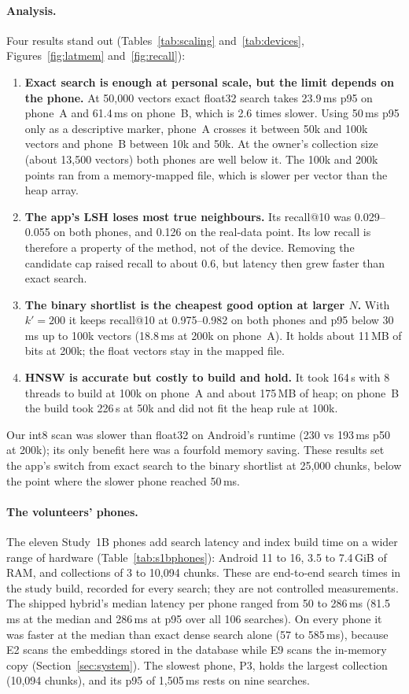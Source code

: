 \documentclass[11pt,a4paper]{article}
\begin{document}
\paragraph{Analysis.} Four results stand out (Tables~\ref{tab:scaling} and~\ref{tab:devices}, Figures~\ref{fig:latmem} and~\ref{fig:recall}):
\begin{enumerate}
  \item \textbf{Exact search is enough at personal scale, but the limit depends on the phone.} At 50,000 vectors exact float32 search takes 23.9\,ms p95 on phone~A and 61.4\,ms on phone~B, which is 2.6 times slower. Using 50\,ms p95 only as a descriptive marker, phone~A crosses it between 50k and 100k vectors and phone~B between 10k and 50k. At the owner's collection size (about 13,500 vectors) both phones are well below it. The 100k and 200k points ran from a memory-mapped file, which is slower per vector than the heap array.
  \item \textbf{The app's LSH loses most true neighbours.} Its recall@10 was 0.029--0.055 on both phones, and 0.126 on the real-data point. Its low recall is therefore a property of the method, not of the device. Removing the candidate cap raised recall to about 0.6, but latency then grew faster than exact search.
  \item \textbf{The binary shortlist is the cheapest good option at larger $N$.} With $k'=200$ it keeps recall@10 at 0.975--0.982 on both phones and p95 below 30\,ms up to 100k vectors (18.8\,ms at 200k on phone~A). It holds about 11\,MB of bits at 200k; the float vectors stay in the mapped file.
  \item \textbf{HNSW is accurate but costly to build and hold.} It took 164\,s with 8 threads to build at 100k on phone~A and about 175\,MB of heap; on phone~B the build took 226\,s at 50k and did not fit the heap rule at 100k.
\end{enumerate}
Our int8 scan was slower than float32 on Android's runtime (230 vs 193\,ms p50 at 200k); its only benefit here was a fourfold memory saving. These results set the app's switch from exact search to the binary shortlist at 25,000 chunks, below the point where the slower phone reached 50\,ms.

\paragraph{The volunteers' phones.} The eleven Study~1B phones add search latency and index build time on a wider range of hardware (Table~\ref{tab:s1bphones}): Android 11 to 16, 3.5 to 7.4\,GiB of RAM, and collections of 3 to 10,094 chunks. These are end-to-end search times in the study build, recorded for every search; they are not controlled measurements. The shipped hybrid's median latency per phone ranged from 50 to 286\,ms (81.5\,ms at the median and 286\,ms at p95 over all 106 searches). On every phone it was faster at the median than exact dense search alone (57 to 585\,ms), because E2 scans the embeddings stored in the database while E9 scans the in-memory copy (Section~\ref{sec:system}). The slowest phone, P3, holds the largest collection (10,094 chunks), and its p95 of 1,505\,ms rests on nine searches.
\end{document}
